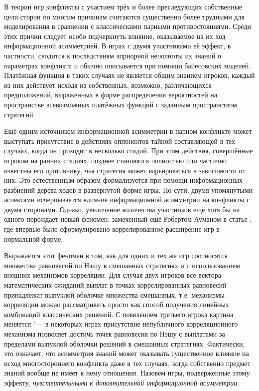 
{\actuality} В теории игр конфликты с участием трёх и более преследующих собственные цели сторон по многим причинам считаются существенно более трудными для моделирования в сравнении с классическими парными противостояниями. Среди этих причин следует особо подчеркнуть влияние, оказываемое на их ход информационной асимметрией. В играх с двумя участниками её эффект, в частности, сводится к последствиям априорной неполноты их знаний о параметрах конфликта и обычно описывается при помощи байесовских моделей. Платёжная функция в таких случаях не является общим знанием игроков, каждый из них действует исходя из собственных, возможно, различающихся предположений, выраженных в форме распределения вероятностей на пространстве всевозможных платёжных функций с заданным пространством стратегий.

Ещё одним источником информационной асимметрии в парном конфликте может выступать присутствие в действиях оппонентов тайной составляющей в тех случаях, когда он проходит в несколько стадий. При этом действия, совершённые игроком на ранних стадиях, позднее становятся полностью или частично известны его противнику, чья стратегия может варьироваться в зависимости от них. Это естественным образом формализуется при помощи информационных разбиений дерева ходов в развёрнутой форме игры. По сути, двумя упомянутыми аспектами исчерпывается влияние информационной асимметрии на конфликты с двумя сторонами. Однако, увеличение количества участников ещё хотя бы на одного порождает новый феномен, замеченный ещё Робертом Ауманом в статье \ifsynopsis\smartcite{Aumann74}\else\cite{Aumann74}\fi, где впервые было сформулировано коррелированное расширение игр в нормальной форме.

Выражается этот феномен в том, как для одних и тех же игр соотносятся множества равновесий по Нэшу в смешанных стратегиях и с использованием внешних механизмов корреляции. Для случая двух игроков все вектора математических ожиданий выплат в точках коррелированных равновесий принадлежат выпуклой оболочке множества смешанных, т.\:е. механизмы корреляции можно рассматривать просто как способ получения линейных комбинаций классических решений. С появлением третьего игрока картина меняется "--- в некоторых играх присутствие непубличного корреляционного механизма позволяет достичь точек равновесия по Нэшу с выплатами за пределами выпуклой оболочки решений в смешанных стратегиях. Фактически, это означает, что асимметрия знаний может оказывать существенное влияние на исход многостороннего конфликта даже в тех случаях, когда собственно предмет знаний вообще не имеет к нему отношения. Назовём игры, подверженные этому эффекту, \emph{чувствительными к дополнительной информационной асимметрии}.

